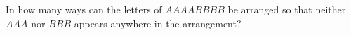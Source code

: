 In how many ways can the letters of $AAAABBBB$ be arranged so that neither $AAA$ nor $BBB$ appears anywhere in the arrangement?
